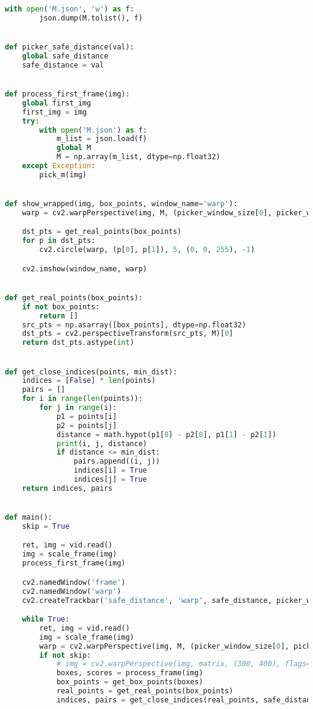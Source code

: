 \begin{lstlisting}[language=Python]
    with open('M.json', 'w') as f:
        json.dump(M.tolist(), f)


def picker_safe_distance(val):
    global safe_distance
    safe_distance = val


def process_first_frame(img):
    global first_img
    first_img = img
    try:
        with open('M.json') as f:
            m_list = json.load(f)
            global M
            M = np.array(m_list, dtype=np.float32)
    except Exception:
        pick_m(img)


def show_wrapped(img, box_points, window_name='warp'):
    warp = cv2.warpPerspective(img, M, (picker_window_size[0], picker_window_size[1]))

    dst_pts = get_real_points(box_points)
    for p in dst_pts:
        cv2.circle(warp, (p[0], p[1]), 5, (0, 0, 255), -1)

    cv2.imshow(window_name, warp)


def get_real_points(box_points):
    if not box_points:
        return []
    src_pts = np.asarray([box_points], dtype=np.float32)
    dst_pts = cv2.perspectiveTransform(src_pts, M)[0]
    return dst_pts.astype(int)


def get_close_indices(points, min_dist):
    indices = [False] * len(points)
    pairs = []
    for i in range(len(points)):
        for j in range(i):
            p1 = points[i]
            p2 = points[j]
            distance = math.hypot(p1[0] - p2[0], p1[1] - p2[1])
            print(i, j, distance)
            if distance <= min_dist:
                pairs.append((i, j))
                indices[i] = True
                indices[j] = True
    return indices, pairs


def main():
    skip = True

    ret, img = vid.read()
    img = scale_frame(img)
    process_first_frame(img)

    cv2.namedWindow('frame')
    cv2.namedWindow('warp')
    cv2.createTrackbar('safe_distance', 'warp', safe_distance, picker_window_size[1], picker_safe_distance)

    while True:
        ret, img = vid.read()
        img = scale_frame(img)
        warp = cv2.warpPerspective(img, M, (picker_window_size[0], picker_window_size[1]))
        if not skip:
            # img = cv2.warpPerspective(img, matrix, (300, 400), flags=cv2.INTER_LINEAR)
            boxes, scores = process_frame(img)
            box_points = get_box_points(boxes)
            real_points = get_real_points(box_points)
            indices, pairs = get_close_indices(real_points, safe_distance)


\end{lstlisting}
